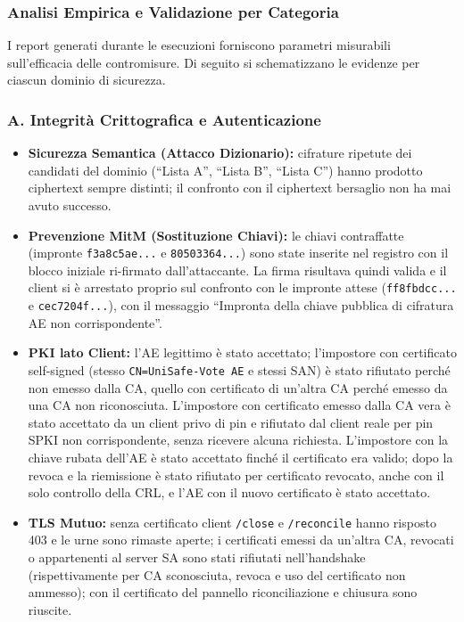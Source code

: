 \documentclass[12pt,a4paper]{article}
\begin{document}
\subsubsection{Analisi Empirica e Validazione per Categoria}

I report generati durante le esecuzioni forniscono parametri misurabili sull'efficacia delle contromisure. Di seguito si schematizzano le evidenze per ciascun dominio di sicurezza.

\subsubsection*{A. Integrità Crittografica e Autenticazione}
\begin{itemize}
  \item \textbf{Sicurezza Semantica (Attacco Dizionario):} cifrature ripetute dei candidati del dominio (``Lista A'', ``Lista B'', ``Lista C'') hanno prodotto ciphertext sempre distinti; il confronto con il ciphertext bersaglio non ha mai avuto successo.
  \item \textbf{Prevenzione MitM (Sostituzione Chiavi):} le chiavi contraffatte (impronte \texttt{f3a8c5ae...} e \texttt{80503364...}) sono state inserite nel registro con il blocco iniziale ri-firmato dall'attaccante. La firma risultava quindi valida e il client si è arrestato proprio sul confronto con le impronte attese (\texttt{ff8fbdcc...} e \texttt{cec7204f...}), con il messaggio ``Impronta della chiave pubblica di cifratura AE non corrispondente''.
  \item \textbf{PKI lato Client:} l'AE legittimo è stato accettato; l'impostore con certificato self-signed (stesso \texttt{CN=UniSafe-Vote AE} e stessi SAN) è stato rifiutato perché non emesso dalla CA, quello con certificato di un'altra CA perché emesso da una CA non riconosciuta. L'impostore con certificato emesso dalla CA vera è stato accettato da un client privo di pin e rifiutato dal client reale per pin SPKI non corrispondente, senza ricevere alcuna richiesta. L'impostore con la chiave rubata dell'AE è stato accettato finché il certificato era valido; dopo la revoca e la riemissione è stato rifiutato per certificato revocato, anche con il solo controllo della CRL, e l'AE con il nuovo certificato è stato accettato.
  \item \textbf{TLS Mutuo:} senza certificato client \texttt{/close} e \texttt{/reconcile} hanno risposto 403 e le urne sono rimaste aperte; i certificati emessi da un'altra CA, revocati o appartenenti al server SA sono stati rifiutati nell'handshake (rispettivamente per CA sconosciuta, revoca e uso del certificato non ammesso); con il certificato del pannello riconciliazione e chiusura sono riuscite.

\end{itemize}
\end{document}
